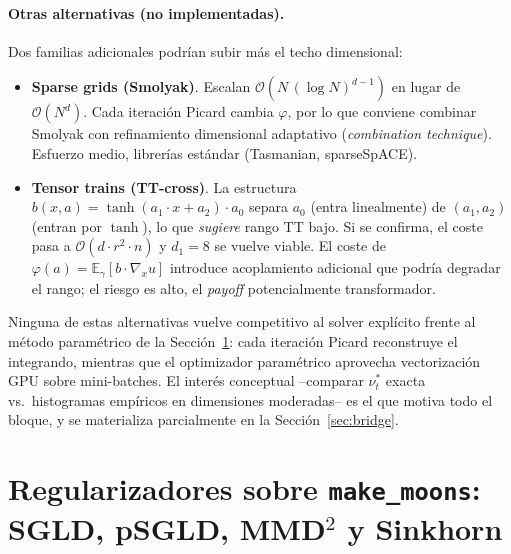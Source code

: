 \documentclass[11pt, a4paper]{article}
\theoremstyle{definition}
\newcommand{\E}{\mathbb{E}}
\begin{document}
\paragraph{Otras alternativas (no implementadas).}
Dos familias adicionales podrían subir más el techo dimensional:

\begin{itemize}
  \item \textbf{Sparse grids (Smolyak)}. Escalan
        $\mathcal O(N\,(\log N)^{d-1})$ en lugar de
        $\mathcal O(N^d)$. Cada iteración Picard cambia
        $\varphi$, por lo que conviene combinar Smolyak con
        refinamiento dimensional adaptativo
        (\emph{combination technique}). Esfuerzo medio,
        librerías estándar (Tasmanian, sparseSpACE).
  \item \textbf{Tensor trains (TT-cross)}. La estructura
        $b(x,a)=\tanh(a_1\!\cdot\!x + a_2)\cdot a_0$ separa
        $a_0$ (entra linealmente) de $(a_1,a_2)$ (entran por
        $\tanh$), lo que \emph{sugiere} rango TT bajo. Si se
        confirma, el coste pasa a
        $\mathcal O(d\cdot r^2 \cdot n)$ y
        $d_1=8$ se vuelve viable. El coste de
        $\varphi(a)=\E_\gamma[b\cdot\nabla_x u]$ introduce
        acoplamiento adicional que podría degradar el rango;
        el riesgo es alto, el \emph{payoff} potencialmente
        transformador.
\end{itemize}

Ninguna de estas alternativas vuelve competitivo al solver
explícito frente al método paramétrico de la
Sección~\ref{sec:reg-moons}: cada iteración Picard reconstruye
el integrando, mientras que el optimizador paramétrico aprovecha
vectorización GPU sobre mini-batches. El interés conceptual
\---comparar $\nu^*_t$ exacta vs.\ histogramas empíricos en
dimensiones moderadas\--- es el que motiva todo el bloque, y se
materializa parcialmente en la Sección~\ref{sec:bridge}.

\section{Regularizadores sobre \texttt{make\_moons}: SGLD,
pSGLD, MMD$^2$ y Sinkhorn}
\label{sec:reg-moons}
\end{document}

